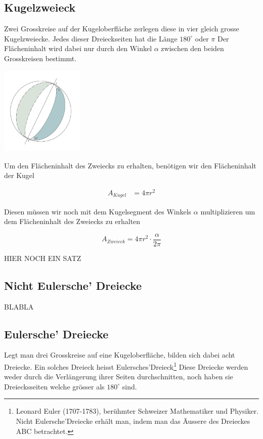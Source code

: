 \begin{refsection}
\subsection{Kugelzweieck}

Zwei Grosskreise auf der Kugeloberfläche zerlegen diese in vier gleich grosse Kugelzweiecke. 
Jedes dieser Dreieckseiten hat die Länge
$180^{\circ}$ oder $\pi$
Der Flächeninhalt wird dabei nur durch den Winkel $\alpha$ zwischen den beiden Grosskreisen bestimmt.

\begin{center}
        \includegraphics[width=0.3\textwidth]{kugel/Zweieck.jpg}
\end{center}

Um den Flächeninhalt des Zweiecks zu erhalten, benötigen wir den Flächeninhalt der Kugel

\begin{align*}
A_{ Kugel } &= 4 \pi r^{2}
\end{align*}

Diesen müssen wir noch mit dem Kugelsegment des Winkels $\alpha$ multiplizieren um dem Flächeninhalt des Zweiecks zu erhalten

\begin{equation}
A_{ Zweieck } = 4 \pi r^{2} \cdot \frac{ \alpha }{ 2 \pi }
\end{equation}

HIER NOCH EIN SATZ

\subsection{Nicht Eulersche’ Dreiecke}

BLABLA

\subsection{Eulersche’ Dreiecke}

Legt man drei Grosskreise auf eine Kugeloberfläche, bilden sich dabei acht Dreiecke. 
Ein solches Dreieck heisst Eulersches’Dreieck\footnote{%
Leonard Euler (1707-1783), berühmter Schweizer Mathematiker und Physiker. 
Nicht Eulersche’Dreiecke erhält man, indem man das Äussere des Dreieckes ABC betrachtet.} 
Diese Dreiecke werden weder durch die Verlängerung ihrer Seiten durchschnitten, 
noch haben sie Dreiecksseiten welche grösser als $180^{\circ}$ sind.


\end{refsection}
